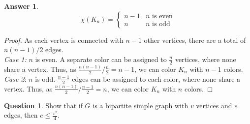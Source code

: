 \documentclass[article, 12pt]{article}
\theoremstyle{definition}
\newtheorem{question}{Question}
\newtheorem{answer}{Answer}
\begin{document}
    \begin{answer}
        \begin{equation*}
            \chi(K_n) = \begin{cases}
                n - 1 & n \text{ is even} \\
                n & n \text{ is odd}
            \end{cases}
        \end{equation*}
    \end{answer}
    \begin{proof} As each vertex is connected with $n-1$ other vertices, there are a total of $n(n-1)/2$ edges.
        \\[12pt]
        \textit{Case 1:} $n$ is even. A separate color can be assigned to $\frac{n}{2}$ vertices, where none share a vertex. Thus, as $\frac{n(n-1)}{2} / \frac{n}{2} = n-1$, we can color $K_n$ with $n-1$ colors.
        \\[12pt]
        \textit{Case 2}: $n$ is odd. $\frac{n-1}{2}$ edges can be assigned to each color, where none share a vertex. Thus, as $\frac{n(n-1)}{2} / \frac{n-1}{2} = n$, we can color $K_n$ with $n$ colors.
    \end{proof}
    \begin{question}
        Show that if $G$ is a bipartite simple graph with $v$ vertices and $e$ edges, then $e \leq \frac{v^2}4$.
    \end{question}
\end{document}
